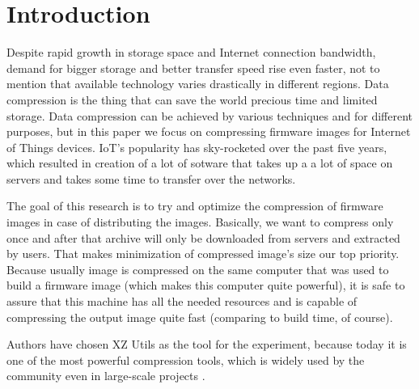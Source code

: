 \documentclass[conference]{IEEEtran}
\begin{document}
\section{Introduction}

Despite rapid growth in storage space and Internet connection bandwidth, demand for bigger storage and better transfer speed rise even faster, not to mention that available technology varies drastically in different regions. Data compression is the thing that can save the world precious time and limited storage. Data compression can be achieved by various techniques and for different purposes, but in this paper we focus on compressing firmware images for Internet of Things devices. IoT's popularity has sky-rocketed over the past five years, which resulted in creation of a lot of sotware that takes up a a lot of space on servers and takes some time to transfer over the networks. 

The goal of this research is to try and optimize the compression of firmware images in case of distributing the images. Basically, we want to compress only once and after that archive will only be downloaded from servers and extracted by users. That makes minimization of compressed image's size our top priority. Because usually image is compressed on the same computer that was used to build a firmware image (which makes this computer quite powerful), it is safe to assure that this machine has all the needed resources and is capable of compressing the output image quite fast (comparing to build time, of course).

Authors have chosen XZ Utils as the tool for the experiment, because today it is one of the most powerful compression tools, which is widely used by the community even in large-scale projects \cite{link:fedora-xz} \cite{link:kernel-xz}.
\end{document}
